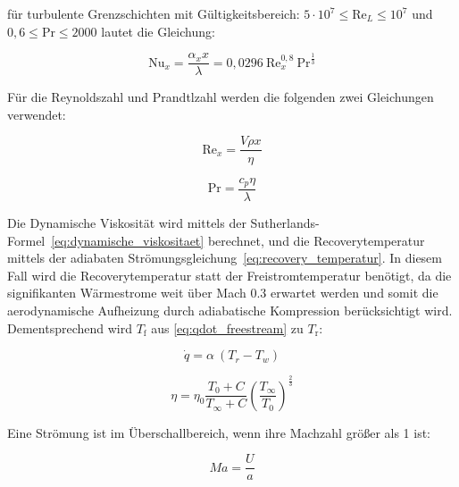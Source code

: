 für turbulente Grenzschichten mit Gültigkeitsbereich: $5 \cdot 10^7 \leq \text{Re}_L \leq 10^7$ und $ 0,6 \leq \text{Pr} \leq 2000$ lautet die Gleichung:

\begin{equation}
  \label{eq:nusselt_turbulent}
  \text{Nu}_x = \frac{\alpha_x x}{\lambda} = 0,0296 \ \text{Re}_x^{0,8} \ \text{Pr}^{\frac{1}{3}}
\end{equation}

Für die Reynoldszahl und Prandtlzahl werden die folgenden zwei Gleichungen verwendet:

\noindent\begin{minipage}{.5\linewidth}
  \begin{equation}
    \label{eq:reynolds}
    \text{Re}_x = \frac{V \rho x}{\eta}
  \end{equation}
\end{minipage}%
\begin{minipage}{.5\linewidth}
  \begin{equation}
    \label{eq:prandtl}
    \text{Pr} = \frac{c_p \eta}{\lambda}
  \end{equation}
\end{minipage}

Die Dynamische Viskosität wird mittels der Sutherlands-Formel~\ref{eq:dynamische_viskositaet} berechnet, und die Recoverytemperatur mittels der adiabaten Strömungsgleichung~\ref{eq:recovery_temperatur}.
In diesem Fall wird die Recoverytemperatur statt der Freistromtemperatur benötigt, da die signifikanten Wärmestrome weit über Mach 0.3 erwartet werden und somit die aerodynamische
Aufheizung durch adiabatische Kompression berücksichtigt wird. Dementsprechend wird $T_\text{f}$ aus \ref{eq:qdot_freestream} zu $T_\text{r}$:

\begin{equation}
  \label{eq:qdot_recovery}
  \dot{q} = \alpha \ (T_r - T_w)
\end{equation}

\begin{equation}
  \label{eq:dynamische_viskositaet}
  \eta = \eta_0 \frac{T_0 + C}{T_{\infty} + C} {\left( \frac{T_{\infty}}{T_0} \right)}^{\frac{2}{3}}
\end{equation}

Eine Strömung ist im Überschallbereich, wenn ihre Machzahl größer als 1 ist:

\begin{equation}
  \label{eq:machzahl}
  Ma = \frac{U}{a}
\end{equation}

